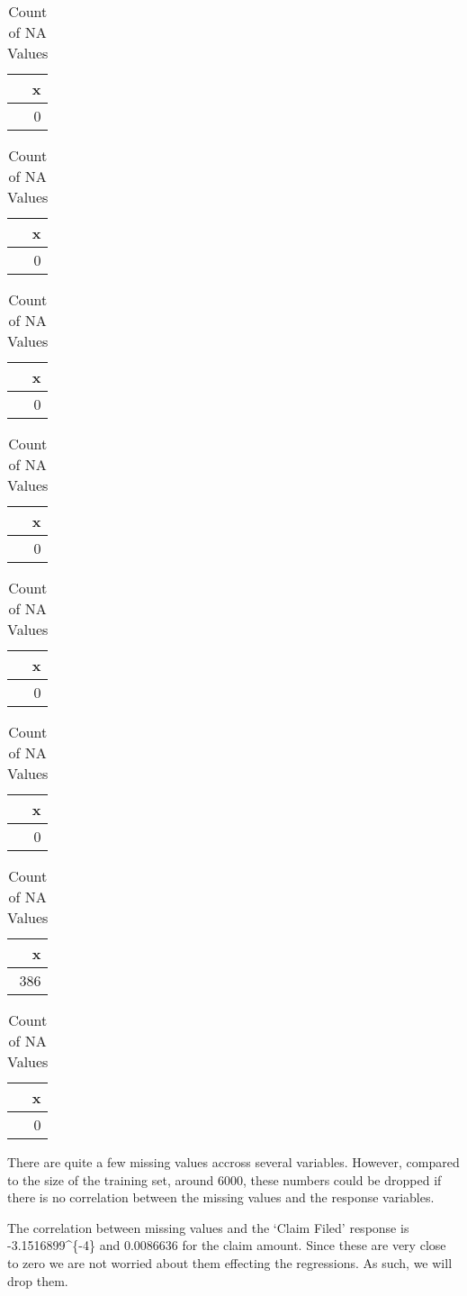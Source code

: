 \documentclass[]{article}
\begin{document}
\begin{table}
\caption{Count of NA Values}

\centering
\begin{tabular}[t]{r}
\hline
x\\
\hline
0\\
\hline
\end{tabular}
\centering
\begin{tabular}[t]{r}
\hline
x\\
\hline
0\\
\hline
\end{tabular}
\centering
\begin{tabular}[t]{r}
\hline
x\\
\hline
0\\
\hline
\end{tabular}
\centering
\begin{tabular}[t]{r}
\hline
x\\
\hline
0\\
\hline
\end{tabular}
\centering
\begin{tabular}[t]{r}
\hline
x\\
\hline
0\\
\hline
\end{tabular}
\centering
\begin{tabular}[t]{r}
\hline
x\\
\hline
0\\
\hline
\end{tabular}
\centering
\begin{tabular}[t]{r}
\hline
x\\
\hline
386\\
\hline
\end{tabular}
\centering
\begin{tabular}[t]{r}
\hline
x\\
\hline
0\\
\hline
\end{tabular}
\end{table}

There are quite a few missing values accross several variables. However,
compared to the size of the training set, around 6000, these numbers
could be dropped if there is no correlation between the missing values
and the response variables.

The correlation between missing values and the `Claim Filed' response is
-3.1516899\^{}\{-4\} and 0.0086636 for the claim amount. Since
these are very close to zero we are not worried about them effecting the
regressions. As such, we will drop them.
\end{document}
